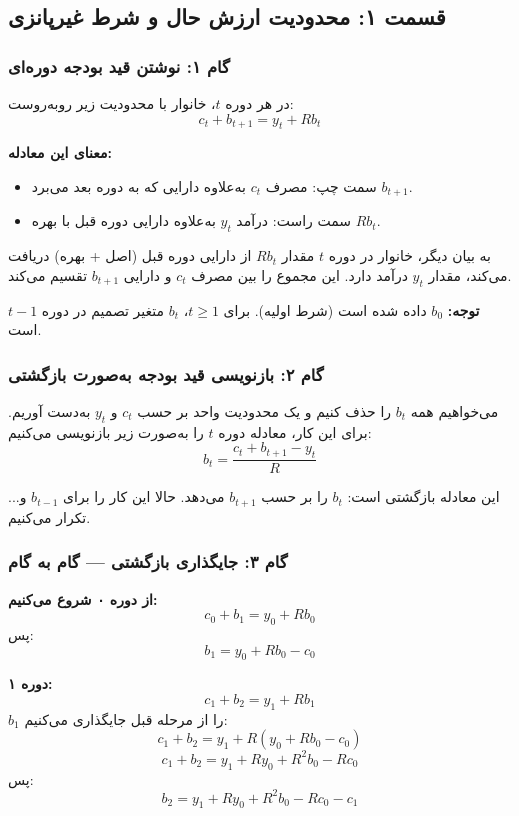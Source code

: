 \documentclass[12pt,a4paper]{article}
\begin{document}
\subsection{قسمت ۱: محدودیت ارزش حال و شرط غیرپانزی}

\subsubsection{گام ۱: نوشتن قید بودجه دوره‌ای}

در هر دوره $t$، خانوار با محدودیت زیر روبه‌روست:
\[
	c_t + b_{t+1} = y_t + R b_t
\]

\textbf{معنای این معادله:}

\begin{itemize}
	\item سمت چپ: مصرف $c_t$ به‌علاوه دارایی که به دوره بعد می‌برد $b_{t+1}$.
	\item سمت راست: درآمد $y_t$ به‌علاوه دارایی دوره قبل با بهره $R b_t$.
\end{itemize}

به بیان دیگر، خانوار در دوره $t$ مقدار $R b_t$ از دارایی دوره قبل (اصل + بهره) دریافت می‌کند، مقدار $y_t$ درآمد دارد. این مجموع را بین مصرف $c_t$ و دارایی $b_{t+1}$ تقسیم می‌کند.

\textbf{توجه:} $b_0$ داده شده است (شرط اولیه). برای $t \geq 1$، $b_t$ متغیر تصمیم در دوره $t-1$ است.

\subsubsection{گام ۲: بازنویسی قید بودجه به‌صورت بازگشتی}

می‌خواهیم همه $b_t$ را حذف کنیم و یک محدودیت واحد بر حسب $c_t$ و $y_t$ به‌دست آوریم. برای این کار، معادله دوره $t$ را به‌صورت زیر بازنویسی می‌کنیم:
\[
	b_t = \frac{c_t + b_{t+1} - y_t}{R}
\]

این معادله بازگشتی است: $b_t$ را بر حسب $b_{t+1}$ می‌دهد. حالا این کار را برای $b_{t-1}$ و... تکرار می‌کنیم.

\subsubsection{گام ۳: جایگذاری بازگشتی — گام به گام}

\textbf{از دوره ۰ شروع می‌کنیم:}
\[
	c_0 + b_1 = y_0 + R b_0
\]
پس:
\[
	b_1 = y_0 + R b_0 - c_0
\]

\textbf{دوره ۱:}
\[
	c_1 + b_2 = y_1 + R b_1
\]
$b_1$ را از مرحله قبل جایگذاری می‌کنیم:
\[
	c_1 + b_2 = y_1 + R(y_0 + R b_0 - c_0)
\]
\[
	c_1 + b_2 = y_1 + R y_0 + R^2 b_0 - R c_0
\]
پس:
\[
	b_2 = y_1 + R y_0 + R^2 b_0 - R c_0 - c_1
\]
\end{document}
